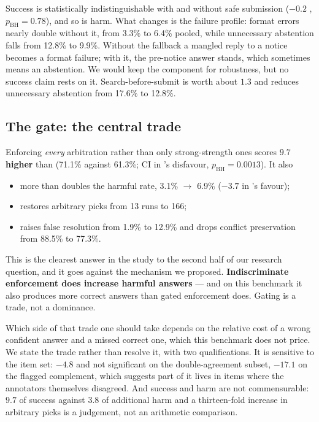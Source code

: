 Success is statistically indistinguishable with and without safe submission ($-0.2$\pp{} ,
$p_{\text{BH}}=0.78$), and so is harm. What changes is the failure profile: format errors nearly double without it,
from 3.3\% to 6.4\% pooled, while unnecessary abstention falls from 12.8\% to 9.9\%. Without the fallback a
mangled reply to a notice becomes a format failure; with it, the pre-notice answer stands, which sometimes means
an abstention. We would keep the component for robustness, but no success claim rests on it.
Search-before-submit is worth about $1.3$\pp{} and reduces unnecessary abstention from 17.6\% to 12.8\%.

\subsection{The gate: the central trade}

Enforcing \emph{every} arbitration rather than only strong-strength ones scores \textbf{$9.7$\pp{} higher} than
 (71.1\% against 61.3\%; CI  in 's disfavour, $p_{\text{BH}}=0.0013$). It also

\begin{itemize}[leftmargin=1.4em,itemsep=1pt,topsep=2pt]
\item more than doubles the harmful rate, 3.1\% $\rightarrow$ 6.9\% ($-3.7$\pp{}  in
's favour);
\item restores arbitrary picks from 13 runs to 166;
\item raises false resolution from 1.9\% to 12.9\% and drops conflict preservation from 88.5\% to 77.3\%.
\end{itemize}

This is the clearest answer in the study to the second half of our research question, and it goes against the
mechanism we proposed. \textbf{Indiscriminate enforcement does increase harmful answers} --- and on this benchmark
it also produces more correct answers than gated enforcement does. Gating is a trade, not a dominance.

Which side of that trade one should take depends on the relative cost of a wrong confident answer and a missed
correct one, which this benchmark does not price. We state the trade rather than resolve it, with two
qualifications. It is sensitive to the item set: $-4.8$\pp{}  and not significant on the
double-agreement subset, $-17.1$\pp{} on the flagged complement, which suggests part of it lives in items where
the annotators themselves disagreed. And success and harm are not commensurable: $9.7$\pp{} of success against
$3.8$\pp{} of additional harm and a thirteen-fold increase in arbitrary picks is a judgement, not an arithmetic
comparison.

